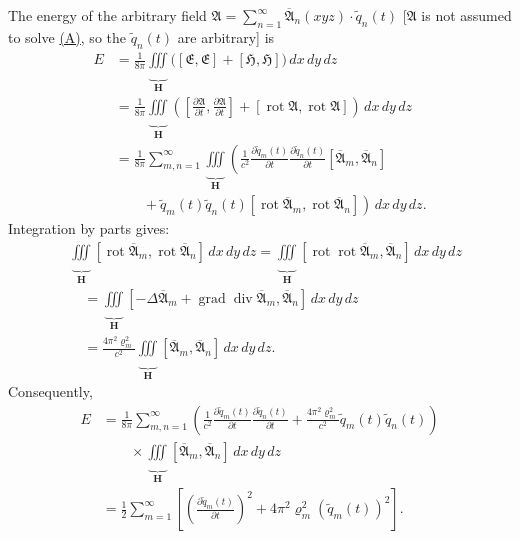 \documentclass[fontsize=13pt,twoside,openany,headings=normal,parskip=false,bookmarkpackage=false,DIV=calc]{scrbook}
\begin{document}
The energy of the arbitrary field $\mathfrak A=\sum_{n=1}^{\infty}\overline{\mathfrak A}_n(xyz)\cdot\widetilde q_n(t)$ [$\mathfrak A$ is not assumed to solve \hyperref[eq:III.6.A]{(A)}, so the $\widetilde q_n(t)$ are arbitrary] is
\begin{align*}
 E&=\frac1{8\pi}\underbrace{\iiint}_{\boldsymbol H}
 \bigl([\mathfrak E,\mathfrak E]+[\mathfrak H,\mathfrak H]\bigr)\,dx\,dy\,dz\\
 &=\frac1{8\pi}\underbrace{\iiint}_{\boldsymbol H}
 \left(\left[\frac{\partial\mathfrak A}{\partial t},\frac{\partial\mathfrak A}{\partial t}\right]
 +[\operatorname{rot}\mathfrak A,\operatorname{rot}\mathfrak A]\right)\,dx\,dy\,dz\\
 &=\frac1{8\pi}\sum_{m,n=1}^{\infty}\underbrace{\iiint}_{\boldsymbol H}
 \left(\frac1{c^2}\frac{\partial\widetilde q_m(t)}{\partial t}
 \frac{\partial\widetilde q_n(t)}{\partial t}
 [\overline{\mathfrak A}_m,\overline{\mathfrak A}_n]\right.\\
 &\qquad\left.{}+\widetilde q_m(t)\widetilde q_n(t)
 [\operatorname{rot}\overline{\mathfrak A}_m,\operatorname{rot}\overline{\mathfrak A}_n]\right)\,dx\,dy\,dz.
\end{align*}
Integration by parts gives:
\begin{align*}
 &\underbrace{\iiint}_{\boldsymbol H}[\operatorname{rot}\overline{\mathfrak A}_m,
 \operatorname{rot}\overline{\mathfrak A}_n]\,dx\,dy\,dz
 =\underbrace{\iiint}_{\boldsymbol H}[\operatorname{rot}\operatorname{rot}\overline{\mathfrak A}_m,
 \overline{\mathfrak A}_n]\,dx\,dy\,dz\\
 &\quad=\underbrace{\iiint}_{\boldsymbol H}[-\Delta\overline{\mathfrak A}_m
 +\operatorname{grad}\operatorname{div}\overline{\mathfrak A}_m,
 \overline{\mathfrak A}_n]\,dx\,dy\,dz\\
 &\quad=\frac{4\pi^2\varrho_m^2}{c^2}
 \underbrace{\iiint}_{\boldsymbol H}[\overline{\mathfrak A}_m,\overline{\mathfrak A}_n]\,dx\,dy\,dz.
\end{align*}
Consequently,
\begin{align*}
 E&=\frac1{8\pi}\sum_{m,n=1}^{\infty}
 \left(\frac1{c^2}\frac{\partial\widetilde q_m(t)}{\partial t}
 \frac{\partial\widetilde q_n(t)}{\partial t}
 +\frac{4\pi^2\varrho_m^2}{c^2}\widetilde q_m(t)\widetilde q_n(t)\right)\\
 &\qquad{}\times\underbrace{\iiint}_{\boldsymbol H}
 [\overline{\mathfrak A}_m,\overline{\mathfrak A}_n]\,dx\,dy\,dz\\
 &=\frac12\sum_{m=1}^{\infty}
 \left[\left(\frac{\partial\widetilde q_m(t)}{\partial t}\right)^2
 +4\pi^2\varrho_m^2(\widetilde q_m(t))^2\right].
\end{align*}
\end{document}
